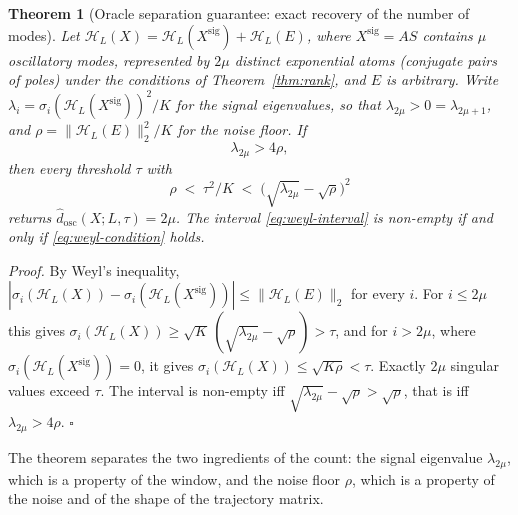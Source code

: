 \documentclass{article}
\newtheorem{theorem}{\bf Theorem}
\begin{document}
\begin{theorem}[Oracle separation guarantee: exact recovery of the number of modes] \label{thm:exact-count}
Let $\mathcal{H}_L(X) = \mathcal{H}_L(X^{\mathrm{sig}}) + \mathcal{H}_L(E)$, where $X^{\mathrm{sig}} = AS$ contains $\mu$ oscillatory modes, represented by $2\mu$ distinct exponential atoms (conjugate pairs of poles) under the conditions of Theorem~\ref{thm:rank}, and $E$ is arbitrary. Write $\lambda_i = \sigma_i(\mathcal{H}_L(X^{\mathrm{sig}}))^{2}/K$ for the signal eigenvalues, so that $\lambda_{2\mu} > 0 = \lambda_{2\mu+1}$, and $\rho = \lVert \mathcal{H}_L(E) \rVert_2^{2}/K$ for the noise floor. If
\begin{equation} \label{eq:weyl-condition}
\lambda_{2\mu} > 4\rho ,
\end{equation}
then every threshold $\tau$ with
\begin{equation} \label{eq:weyl-interval}
\rho \;<\; \tau^{2}/K \;<\; \bigl(\sqrt{\lambda_{2\mu}} - \sqrt{\rho}\bigr)^{2}
\end{equation}
returns $\widehat{d}_{\mathrm{osc}}(X; L, \tau) = 2\mu$. The interval \eqref{eq:weyl-interval} is non-empty if and only if \eqref{eq:weyl-condition} holds.
\end{theorem}

\textit{Proof.} By Weyl's inequality, $|\sigma_i(\mathcal{H}_L(X)) - \sigma_i(\mathcal{H}_L(X^{\mathrm{sig}}))| \le \lVert \mathcal{H}_L(E) \rVert_2$ for every $i$. For $i \le 2\mu$ this gives $\sigma_i(\mathcal{H}_L(X)) \ge \sqrt{K}\,(\sqrt{\lambda_{2\mu}} - \sqrt{\rho}) > \tau$, and for $i > 2\mu$, where $\sigma_i(\mathcal{H}_L(X^{\mathrm{sig}})) = 0$, it gives $\sigma_i(\mathcal{H}_L(X)) \le \sqrt{K\rho} < \tau$. Exactly $2\mu$ singular values exceed $\tau$. The interval is non-empty iff $\sqrt{\lambda_{2\mu}} - \sqrt{\rho} > \sqrt{\rho}$, that is iff $\lambda_{2\mu} > 4\rho$. $\square$

The theorem separates the two ingredients of the count: the signal eigenvalue $\lambda_{2\mu}$, which is a property of the window, and the noise floor $\rho$, which is a property of the noise and of the shape of the trajectory matrix.
\end{document}
